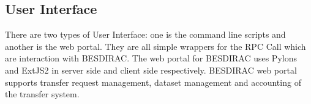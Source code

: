 \subsection{User Interface}
There are two types of User Interface: one is the command line scripts and 
another is the web portal. 
They are all simple wrappers for the RPC Call which are interaction
with BESDIRAC.
The web portal for BESDIRAC uses Pylons and ExtJS2 in server side and
client side respectively\cite{bib:webportal}. BESDIRAC web portal supports
transfer request management, dataset management and  
accounting of the transfer system.

